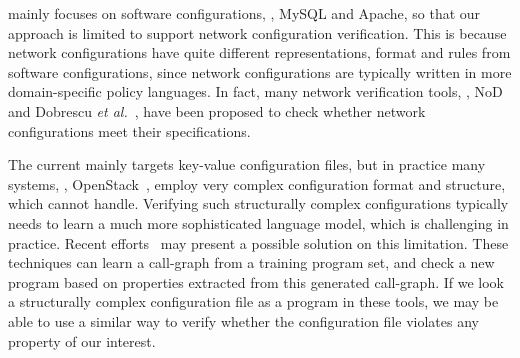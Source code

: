 \app mainly focuses on software configurations, \eg, MySQL and Apache,
so that our approach is limited to support network configuration
verification. This is because network configurations have quite
different representations, format and rules from software configurations,
since network configurations are typically written in 
more domain-specific policy languages.
In fact, many network verification tools, 
\eg, NoD~\cite{lopes15checking} and 
Dobrescu {\em et al.}~\cite{dobrescu14software},
have been proposed to check whether network configurations
meet their specifications.

The current \app mainly targets key-value configuration files,
but in practice many systems, \eg, OpenStack~\cite{OpenStack},
employ very complex configuration format and structure,
which \app cannot handle.
Verifying such structurally complex configurations typically needs
\app to learn a much more sophisticated language model,
which is challenging in practice.
Recent efforts~\cite{raychev15predicting, raychev16learning} 
may present a possible solution on this limitation.
These techniques can learn a call-graph from a training program set,
and check a new program based on properties extracted from this
generated call-graph. If we look a structurally complex configuration 
file as a program in these tools, we may be able to use a similar way
to verify whether the configuration file violates any 
property of our interest. 

